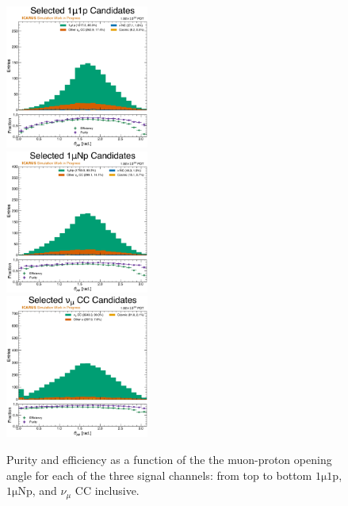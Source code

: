 \begin{figure}[!htb]
    \centering
    \includegraphics[width=0.42\textwidth]{figures/neutrino_selection/selected_hist1d_1mu1p_opening_angle.pdf}\\
    \includegraphics[width=0.42\textwidth]{figures/neutrino_selection/selected_hist1d_1muNp_opening_angle.pdf}\\
    \includegraphics[width=0.42\textwidth]{figures/neutrino_selection/selected_hist1d_1muX_opening_angle.pdf}\\
    \caption{Purity and efficiency as a function of the the muon-proton opening angle for each of the three signal channels: from top to bottom $\mathrm{1\mu 1p}$, $\mathrm{1\mu Np}$, and $\nu_\mu$ CC inclusive.}
    \label{fig:pureff_opening_angle}
\end{figure}

